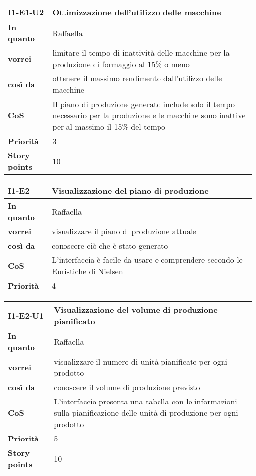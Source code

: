 \begin{table}[H]
  \begin{tabularx}{\textwidth}{lX}
    \toprule
    \textbf{I1-E1-U2} & \textbf{Ottimizzazione dell'utilizzo delle macchine} \\
    \midrule
    \textbf{In quanto} & Raffaella \\
    \textbf{vorrei} & limitare il tempo di inattività delle macchine per la produzione di formaggio al 15\% o meno \\
    \textbf{così da} & ottenere il massimo rendimento dall'utilizzo delle macchine \\
    \midrule
    \textbf{CoS} & Il piano di produzione generato include solo il tempo necessario per la produzione e le macchine sono inattive per al massimo il 15\% del tempo \\
    \midrule
    \textbf{Priorità} & 3 \\
    \textbf{Story points} & 10 \\
    \bottomrule
  \end{tabularx}
  \label{user-story:i1-e1-u2}
\end{table}

\begin{table}[H]
  \begin{tabularx}{\textwidth}{lX}
    \toprule
    \textbf{I1-E2} & \textbf{Visualizzazione del piano di produzione} \\
    \midrule
    \textbf{In quanto} & Raffaella \\
    \textbf{vorrei} & visualizzare il piano di produzione attuale \\
    \textbf{così da} & conoscere ciò che è stato generato \\
    \midrule
    \textbf{CoS} & L'interfaccia è facile da usare e comprendere secondo le Euristiche di Nielsen~\cite{cit:nielsen} \\
    \midrule
    \textbf{Priorità} & 4 \\
    \bottomrule
  \end{tabularx}
  \label{user-story:i1-e2}
\end{table}

\begin{table}[H]
  \begin{tabularx}{\textwidth}{lX}
    \toprule
    \textbf{I1-E2-U1} & \textbf{Visualizzazione del volume di produzione pianificato} \\
    \midrule
    \textbf{In quanto} & Raffaella \\
    \textbf{vorrei} & visualizzare il numero di unità pianificate per ogni prodotto \\
    \textbf{così da} & conoscere il volume di produzione previsto \\
    \midrule
    \textbf{CoS} & L'interfaccia presenta una tabella con le informazioni sulla pianificazione delle unità di produzione per ogni prodotto \\
    \midrule
    \textbf{Priorità} & 5 \\
    \textbf{Story points} & 10 \\
    \bottomrule
  \end{tabularx}
  \label{user-story:i1-e2-u1}
\end{table}

